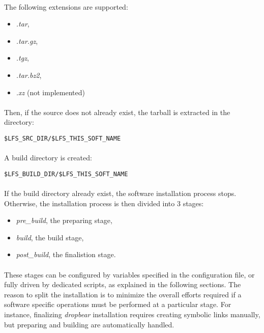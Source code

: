 \documentclass[a4paper, 11pt]{article}
\begin{document}
\paragraph{}
The following extensions are supported:
\begin{itemize}
\item \textit{.tar},
\item \textit{.tar.gz},
\item \textit{.tgz},
\item \textit{.tar.bz2},
\item \textit{.xz} (not implemented)
\end{itemize}

\paragraph{}
Then, if the source does not already exist, the tarball is extracted in the
directory:\\

\begin{lstlisting}[frame=tb]
$LFS_SRC_DIR/$LFS_THIS_SOFT_NAME
\end{lstlisting}

\paragraph{}
A build directory is created:\\
\begin{lstlisting}[frame=tb]
$LFS_BUILD_DIR/$LFS_THIS_SOFT_NAME
\end{lstlisting}

\paragraph{}
If the build directory already exist, the software installation process stops.
Otherwise, the installation process is then divided into 3 stages:
\begin{itemize}
\item \textit{pre\_build}, the preparing stage,
\item \textit{build}, the build stage,
\item \textit{post\_build}, the finalistion stage.
\end{itemize}

\paragraph{}
These stages can be configured by variables specified in the configuration file,
or fully driven by dedicated scripts, as explained in the following sections.
The reason to split the installation is to minimize the overall efforts required
if a software specific operations must be performed at a particular stage. For
instance, finalizing \textit{dropbear} installation requires creating symbolic
links manually, but preparing and building are automatically handled.
\end{document}
